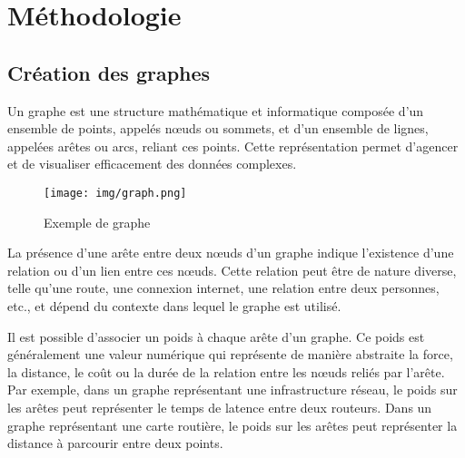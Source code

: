 \documentclass[journal, a4paper]{IEEEtran}
\begin{document}
\section{Méthodologie}\label{sec:met}
	

\subsection{Création des graphes}
Un graphe est une structure mathématique et informatique composée d'un ensemble de points, appelés nœuds ou sommets, et d'un ensemble de lignes, appelées arêtes ou arcs, reliant ces points. Cette représentation permet d'agencer et de visualiser efficacement des données complexes.

\begin{figure}[h]
	\center
	\texttt{[image: img/graph.png]}
	\caption{Exemple de graphe}\label{fig:graph}
\end{figure}


La présence d'une arête entre deux nœuds d'un graphe indique l'existence d'une relation ou d'un lien entre ces nœuds. Cette relation peut être de nature diverse, telle qu'une route, une connexion internet, une relation entre deux personnes, etc., et dépend du contexte dans lequel le graphe est utilisé.

Il est possible d'associer un poids à chaque arête d'un graphe. Ce poids est généralement une valeur numérique qui représente de manière abstraite la force, la distance, le coût ou la durée de la relation entre les nœuds reliés par l'arête. Par exemple, dans un graphe représentant une infrastructure réseau, le poids sur les arêtes peut représenter le temps de latence entre deux routeurs. Dans un graphe représentant une carte routière, le poids sur les arêtes peut représenter la distance à parcourir entre deux points.
\end{document}
